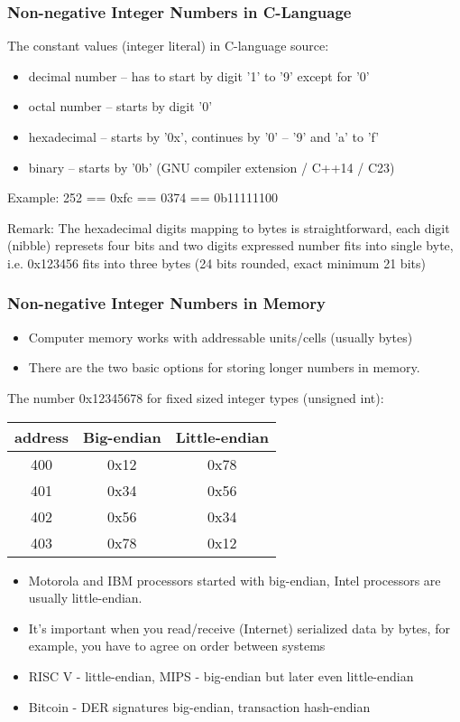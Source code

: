 \documentclass{beamer}
\begin{document}
\begin{frame}
\frametitle{Non-negative Integer Numbers in C-Language}
The constant values (integer literal) in C-language source:
\begin{itemize}
\item decimal number -- has to start by digit '1' to '9' except for '0'
\item octal number -- starts by digit '0'
\item hexadecimal -- starts by '0x', continues by '0' -- '9' and 'a' to 'f'
\item binary -- starts by '0b' (GNU compiler extension / C++14 / C23)
\end{itemize}
\bigskip
Example: 252 == 0xfc == 0374 == 0b11111100
\bigskip

Remark: The hexadecimal digits mapping to bytes is straightforward, each digit (nibble) represets four bits and two digits expressed number fits into single byte, i.e. 0x123456 fits into three bytes (24 bits rounded, exact minimum 21 bits)
\end{frame}


\begin{frame}
\frametitle{Non-negative Integer Numbers in Memory}

\begin{itemize}
\item Computer memory works with addressable units/cells (usually bytes)
\item There are the two basic options for storing longer numbers in memory.
\end{itemize}

The number 0x12345678 for fixed sized integer types (unsigned int):
\begin{tabular}{|c|c|c|}\hline
address & Big-endian & Little-endian \\ \hline
400 & 0x12 & 0x78 \\ \hline
401 & 0x34 & 0x56 \\ \hline
402 & 0x56 & 0x34 \\ \hline
403 & 0x78 & 0x12 \\ \hline
\end{tabular}

\begin{itemize}
\item Motorola and IBM processors started with big-endian, Intel processors are usually little-endian.
\item It's important when you read/receive (Internet) serialized data by bytes, for example, you have to agree on order between systems
\item RISC V - little-endian, MIPS - big-endian but later even little-endian
\item Bitcoin - DER signatures big-endian, transaction hash-endian
\end{itemize}
\end{frame}
\end{document}
